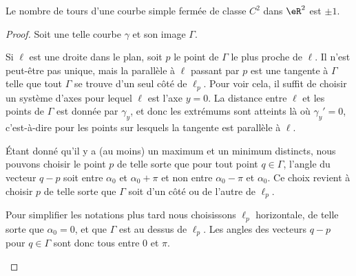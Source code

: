 \begin{theorem}      \label{THOooEQWOooBCRMMZ}
	Le nombre de tours d'une courbe simple fermée de classe \(  C^{2}\) dans \( \eR^2\) est \( \pm 1\).
\end{theorem}

\begin{proof}
	Soit une telle courbe \( \gamma\) et son image \( \Gamma\).
	\begin{subproof}

		Si \( \ell\) est une droite dans le plan, soit \( p\) le point de \( \Gamma\) le plus proche de \( \ell\). Il n'est peut-être pas unique, mais la parallèle à \( \ell\) passant par \( p\) est une tangente à \( \Gamma\) telle que tout \( \Gamma\) se trouve d'un seul côté de \( \ell_p\). Pour voir cela, il suffit de choisir un système d'axes pour lequel \( \ell\) est l'axe \( y=0\). La distance entre \( \ell\) et les points de \( \Gamma\) est donnée par \( \gamma_y\), et donc les extrémums sont atteints là où \( \gamma_y'=0\), c'est-à-dire pour les points sur lesquels la tangente est parallèle à \( \ell\).

		Étant donné qu'il y a (au moins) un maximum et un minimum distincts, nous pouvons choisir le point \( p\) de telle sorte que pour tout point \( q\in \Gamma\), l'angle du vecteur \( q-p\) soit entre \( \alpha_0\) et \( \alpha_0+\pi\) et non entre \( \alpha_0-\pi\) et \( \alpha_0\). Ce choix revient à choisir \( p\) de telle sorte que \( \Gamma\) soit d'un côté ou de l'autre de \( \ell_p\).

		Pour simplifier les notations plus tard nous choisissons \( \ell_p\) horizontale, de telle sorte que \( \alpha_0=0\), et que \( \Gamma\) est au dessus de \( \ell_p\). Les angles des vecteurs \( q-p\) pour \( q\in \Gamma\) sont donc tous entre \( 0\) et \( \pi\).



\end{subproof}
\end{proof}
